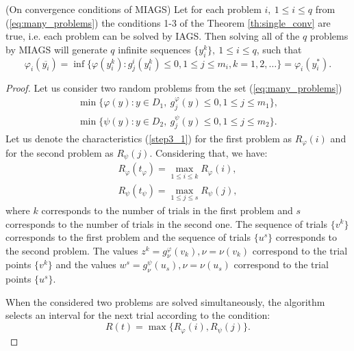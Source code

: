 \documentclass[runningheads]{llncs}
\begin{document}
\begin{theorem} (On convergence conditions of MIAGS) Let for each problem \(i,\:1\leqslant i\leqslant q\) from (\ref{eq:many_problems})
  the conditions 1-3 of the Theorem \ref{th:single_conv} are true, i.e. each problem can be solved by IAGS.
  Then solving all of the \(q\) problems by MIAGS will
  generate \(q\) infinite sequences \(\{y^k_i\},\:1\leqslant i\leqslant q\), such that
  \begin{displaymath}
    \varphi_i(\overline{y_i})=\inf\{ \varphi(y^k_i): g^i_j(y^k_i)\leqslant 0,1\leqslant j\leqslant m_i, k=1,2,\dots\}=\varphi_i(y^*_i).
  \end{displaymath}
\end{theorem}
\begin{proof}
  Let us consider two random problems from the set (\ref{eq:many_problems})
  \begin{equation}
      \begin{array}{lr}
        \min\{\varphi(y):y\in D_1,\: g_j^\varphi(y)\leqslant 0, 1\leqslant j\leqslant m_1\}, \\
        \min\{\psi(y):y\in D_2,\: g_j^\psi(y)\leqslant 0, 1\leqslant j\leqslant m_2\}.
      \end{array}
  \end{equation}
  Let us denote the characteristics (\ref{step3_1}) for the first problem as \(R_\varphi(i)\)
  and for the second problem as \(R_\psi(j)\). Considering that, we have:
  \begin{equation}
      \begin{array}{lr}
        R_\varphi(t_\varphi)=\max_{1\leqslant i\leqslant k}R_\varphi(i), \\
        R_\psi(t_\psi)=\max_{1\leqslant j\leqslant s}R_\psi(j),
      \end{array}
  \end{equation}
  where \(k\) corresponds to the number of trials in the first problem and \(s\)
  corresponds to the number of trials in the second one. The sequence of trials \(\{v^k\}\)
  corresponds to the first problem and the sequence of trials \(\{u^s\}\)
  corresponds to the second problem. The values \(z^k=g^\varphi_\nu(v_k),\nu =\nu (v_{k})\) correspond to the
  trial points \(\{v^k\}\) and the values \(w^s=g^\psi_\nu(u_s),\nu =\nu(u_{s})\) correspond to the
  trial points \(\{u^s\}\).

  When the considered two problems are solved simultaneously, the algorithm selects
  an interval for the next trial according to the condition:
  \begin{equation}
    R(t) = \max\{R_\varphi(i),R_\psi(j)\}.
  \end{equation}


\end{proof}
\end{document}

